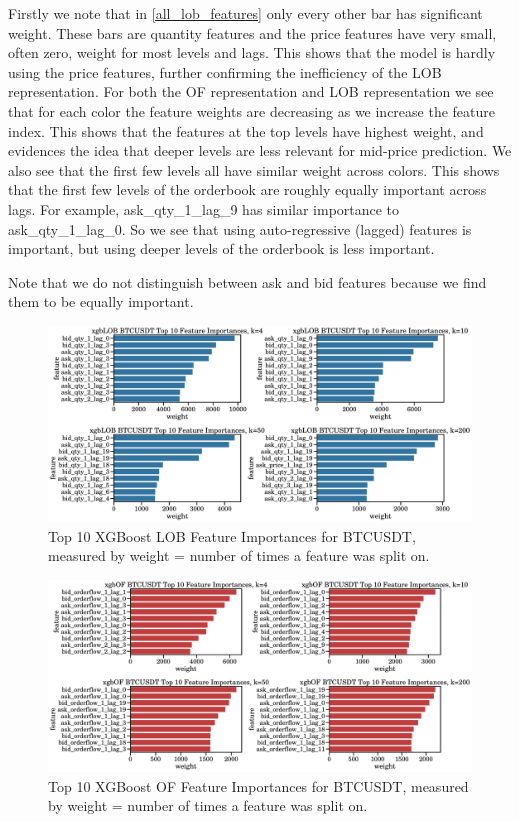 Firstly we note that in \ref{all_lob_features} only every other bar has significant weight. These bars are quantity features and
the price features have very small, often zero, weight for most levels and lags.
This shows that the model is hardly using the price features, further confirming
the inefficiency of the LOB representation. For both the OF representation and LOB representation we see that for each color the feature weights
are decreasing as we increase the feature index. This shows that the features at the top levels have highest weight, and evidences
the idea that deeper levels are less relevant for mid-price prediction.
We also see that the first few levels all have similar weight across colors. This shows that the first few levels of the orderbook
are roughly equally important across lags. For example, ask\_qty\_1\_lag\_9 has similar importance to ask\_qty\_1\_lag\_0. So we see
that using auto-regressive (lagged) features is important, but using deeper levels of the orderbook is less important.

Note that we do not distinguish between ask and bid features because we find them to be equally important.

\begin{figure}[htpb!]
    \centering
    \includegraphics[width=1.0\textwidth]{./images/xgboost_LOB_BTCUSDT_top_10_feature_importances.pdf}
    \caption{Top 10 XGBoost LOB Feature Importances for BTCUSDT, measured by weight = number of times a feature was split on.}
    \label{top_10_lob_features}
\end{figure}
\begin{figure}[htpb!]
    \centering
    \includegraphics[width=1.0\textwidth]{./images/xgboost_OF_BTCUSDT_top_10_feature_importances.pdf}
    \caption{Top 10 XGBoost OF Feature Importances for BTCUSDT, measured by weight = number of times a feature was split on.}
    \label{top_10_of_features}
\end{figure}



